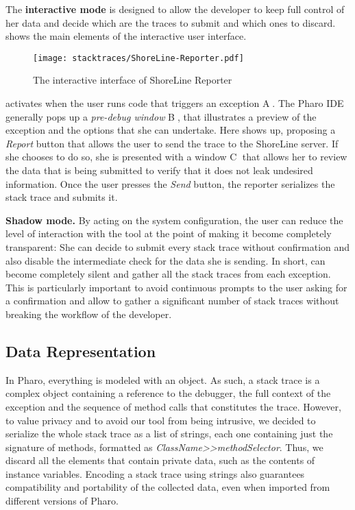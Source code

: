 The \textbf{interactive mode} is designed to allow the developer to keep full control of her data and decide which are the traces to submit and which ones to discard.  shows the main elements of the interactive user interface. 

\begin{figure}[ht]
\begin{center}
  \texttt{[image: stacktraces/ShoreLine-Reporter.pdf]}
  \caption{The interactive interface of ShoreLine Reporter}
  \label{fig:shoreline-reporter}
\end{center}
\end{figure}

\shr activates when the user runs code that triggers an exception \textcircled{\scriptsize A}. The Pharo IDE generally pops up a \emph{pre-debug window} \textcircled{\scriptsize B}, that illustrates a preview of the exception and the options that she can undertake. Here \shr shows up, proposing a \emph{Report} button that allows the user to send the trace to the ShoreLine server. If she chooses to do so, she is presented with a window \textcircled{\scriptsize C} that allows her to review the data that is being submitted to verify that it does not leak undesired information. Once the user presses the \emph{Send} button, the reporter serializes the stack trace and submits it.

\textbf{Shadow mode.} By acting on the system configuration, the user can reduce the level of interaction with the tool at the point of making it become completely transparent: She can decide to submit every stack trace without confirmation and also disable the intermediate check for the data she is sending. In short, \shr can become completely silent and gather all the stack traces from each exception. This is particularly important to avoid continuous prompts to the user asking for a confirmation and allow \shr to gather a significant number of stack traces without breaking the workflow of the developer.

\subsection{Data Representation}

In Pharo, everything is modeled with an object. As such, a stack trace is a complex object containing a reference to the debugger, the full context of the exception and the sequence of method calls that constitutes the trace. However, to value privacy and to avoid our tool from being intrusive, we decided to serialize the whole stack trace as a list of strings, each one containing just the signature of methods, formatted as \textit{ClassName{>}{>}methodSelector}. Thus, we discard all the elements that contain private data, such as the contents of instance variables. Encoding a stack trace using strings also guarantees compatibility and portability of the collected data, even when imported from different versions of Pharo.

